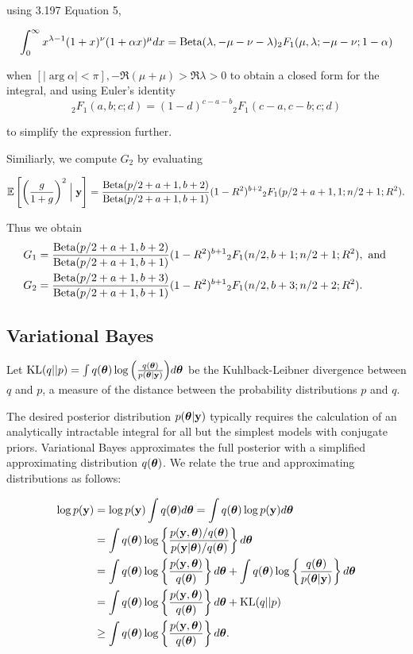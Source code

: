 \documentclass{amsart}[12pt]
\begin{document}
using \cite{Gradshteyn1988} 3.197 Equation 5,

\[
	\int_0^\infty x^{\lambda-1} (1+x)^\nu (1 + \alpha x)^{\mu} dx = \text{Beta}(\lambda, -\mu-\nu-\lambda) {}_2 F_1 (\mu, \lambda; -\mu-\nu; 1 - \alpha)
\]

when $[|\arg \alpha| < \pi], -\Re(\mu + \mu) > \Re \lambda > 0$ to obtain a closed form for the integral,  and
using Euler's identity
\[
	{}_2 F_1(a, b; c; d) = (1 - d)^{c - a -  b} {}_2 F_1(c - a, c - b; c; d)
\]

to simplify the expression further.

Similiarly, we compute $G_2$ by evaluating

\[
	\mathbb{E}\left[ \left(\frac{g}{1 + g} \right)^2 \Bigm| {\bf y} \right] = \frac{\text{Beta}(p/2 + a + 1, b + 2)}{\text{Beta}(p /2 + a + 1, b + 1)} (1 - R^2)^{b+2} {}_2 F_1(p/2 + a + 1, 1; n/2 + 1; R^2).
\]

Thus we obtain
\begin{align*}
	G_1 & = \frac{\text{Beta}(p/2 + a + 1, b + 2)}{\text{Beta}(p /2 + a + 1, b + 1)} (1 - R^2)^{b+1} {}_2 F_1(n/2, b + 1; n/2 + 1; R^2), \text{ and } \\
	G_2 & = \frac{\text{Beta}(p/2 + a + 1, b + 3)}{\text{Beta}(p /2 + a + 1, b + 1)} (1 - R^2)^{b+1} {}_2 F_1(n/2, b + 3; n/2 + 2; R^2). 
\end{align*}


\subsection{Variational Bayes}

Let $\text{KL}(q||p) = \int q({\boldsymbol \theta}) \log{\left( \frac{q({\boldsymbol\theta})}{p({\boldsymbol\theta}|{\bf y})} \right)} d {\boldsymbol \theta}$ be the
Kuhlback-Leibner divergence between $q$ and $p$, a measure of the distance between the probability
distributions $p$ and $q$.

The desired posterior distribution $p({\boldsymbol \theta} | {\bf y})$ typically requires the calculation of an analytically
intractable integral for all but the simplest models with conjugate priors. Variational Bayes approximates the
full posterior with a simplified approximating distribution $q({\boldsymbol \theta})$. We relate the true and
approximating distributions as follows:

\begin{align*}
	\log p({\bf y}) & = \log p({\bf y}) \int q({\boldsymbol \theta}) d {\boldsymbol \theta} = \int q({\boldsymbol \theta}) \log p({\bf y}) d {\boldsymbol \theta}                                    \\
	            & = \int q({\boldsymbol \theta}) \log \left\{ \frac{p({\bf y}, {\boldsymbol \theta}) / q({\boldsymbol \theta})}{p({\bf y}|{\boldsymbol \theta}) / q({\boldsymbol \theta})} \right\} d {\boldsymbol \theta} \\
	            & = \int q({\boldsymbol \theta}) \log\left\{ \frac{p({\bf y}, {\boldsymbol \theta})}{q({\boldsymbol \theta})} \right\} d {\boldsymbol \theta} +                              
	\int q({\boldsymbol \theta}) \log\left\{ \frac{q({\boldsymbol \theta})}{p({\boldsymbol \theta}|{\bf y})} \right\} d {\boldsymbol \theta} \\
	            & = \int q({\boldsymbol \theta}) \log\left\{ \frac{p({\bf y}, {\boldsymbol \theta})}{q({\boldsymbol \theta})} \right\} d {\boldsymbol \theta} +                              
	\text{KL}(q||p) \\
	            & \geq \int q({\boldsymbol \theta}) \log\left\{ \frac{p({\bf y}, {\boldsymbol \theta})}{q({\boldsymbol \theta})} \right\} d {\boldsymbol \theta}.                            
\end{align*}
\end{document}
